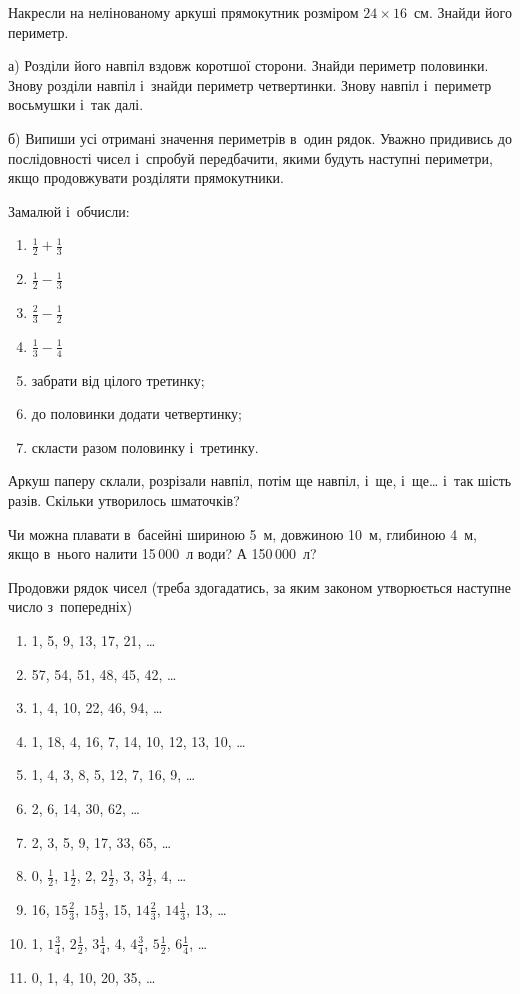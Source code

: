 \problem
Накресли на нелінованому аркуші прямокутник розміром $24\times16$~см.
Знайди його периметр.

а) Розділи його навпіл вздовж коротшої сторони.
Знайди периметр половинки.
Знову розділи навпіл і~знайди периметр четвертинки.
Знову навпіл і~периметр восьмушки і~так далі.

б) Випиши усі отримані значення периметрів в~один рядок.
Уважно придивись до послідовності чисел і~спробуй передбачити,
якими будуть наступні периметри, якщо продовжувати розділяти прямокутники.


\problem
Замалюй і~обчисли:
\begin{enumerate}
    \item $\frac{1}{2} + \frac{1}{3}$
    \item $\frac{1}{2} - \frac{1}{3}$
    \item $\frac{2}{3} - \frac{1}{2}$
    \item $\frac{1}{3} - \frac{1}{4}$
    \item забрати від цілого третинку;
    \item до половинки додати четвертинку;
    \item скласти разом половинку і~третинку.
\end{enumerate}


\problem
Аркуш паперу склали, розрізали навпіл, потім ще навпіл, і~ще, і~ще\ldots
і~так шість разів.
Скільки утворилось шматочків?


\problem
Чи можна плавати в~басейні шириною 5~м, довжиною 10~м, глибиною 4~м,
якщо в~нього налити 15\,000~л води? А 150\,000~л?


\problem
Продовжи рядок чисел (треба здогадатись, за яким законом утворюється
наступне число з~попередніх)
\begin{enumerate}
    \item 1, 5, 9, 13, 17, 21, \ldots
    \item 57, 54, 51, 48, 45, 42, \ldots
    \item 1, 4, 10, 22, 46, 94, \ldots
    \item 1, 18, 4, 16, 7, 14, 10, 12, 13, 10, \ldots
    \item 1, 4, 3, 8, 5, 12, 7, 16, 9, \ldots
    \item 2, 6, 14, 30, 62, \ldots
    \item 2, 3, 5, 9, 17, 33, 65, \ldots
    \item 0, $\frac{1}{2}$, $1\frac{1}{2}$,
    2, $2\frac{1}{2}$, 3, $3\frac{1}{2}$, 4, \ldots
    \item 16, $15\frac{2}{3}$, $15\frac{1}{3}$, 15,
    $14\frac{2}{3}$, $14\frac{1}{3}$, 13, \ldots
    \item 1, $1\frac{3}{4}$, $2\frac{1}{2}$, $3\frac{1}{4}$,
    4, $4\frac{3}{4}$, $5\frac{1}{2}$, $6\frac{1}{4}$, \ldots
    \item 0, 1, 4, 10, 20, 35, \ldots 
\end{enumerate}


